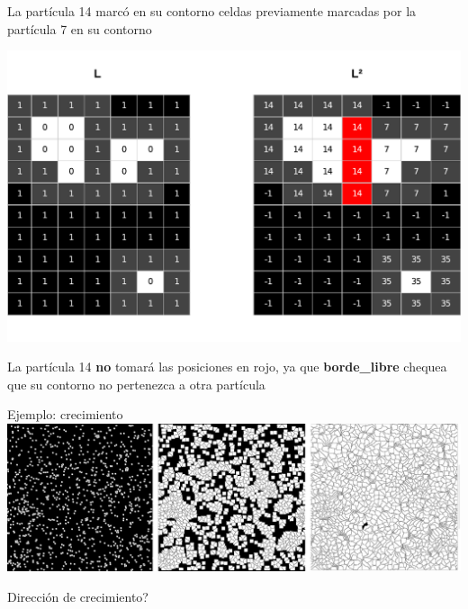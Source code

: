 \documentclass[spanish,unknownkeysallowed]{beamer}
\begin{document}
\begin{frame}
La partícula 14 marcó en su contorno celdas previamente marcadas por la partícula 7 en su contorno
\centerline{\includegraphics[scale = 0.45]{../figures/sistemaparticulas}}
La partícula 14 \textbf{no} tomará las posiciones en rojo, ya que \textbf{borde\_libre} chequea que su contorno no pertenezca a otra partícula
\end{frame}

\begin{frame}{Ejemplo: crecimiento}
\includegraphics[scale = 0.15]{../figures/modeladocrec}

\centering
Dirección de crecimiento?
\end{frame}
\end{document}
